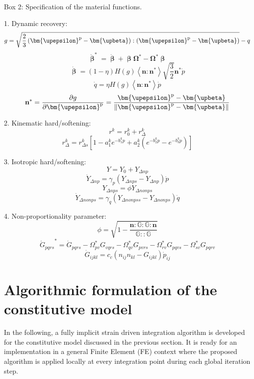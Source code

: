\begin{framed}
\label{Box:1}
Box 2: Specification of the material functions.

1. Dynamic recovery:
\[g = \sqrt {\frac{2}{3}\left( {{{\bm{\upepsilon }}^{\rm{p}}} - {\bm{\upbeta}}} \right):\left( {{{\bm{\upepsilon }}^{\rm{p}}} - {\bm{\upbeta}}} \right)}  - q\]
\[{\mathring {\bm{\upbeta }}^{*}} = \dot {\bm{\upbeta }}  + \bm{\upbeta } {{\mathbf{\Omega }}^*} - {{\mathbf{\Omega }}^*}\bm{\upbeta }\]
\[\dot{\bm{\upbeta}}  = \left( {1 - \eta } \right)H\left( g \right)\left\langle {{\mathbf{n}}:{{\mathbf{n}}^*}} \right\rangle \sqrt {\frac{3}{2}} {{\mathbf{n}}^*}\dot p\]
\[\dot q = \eta H\left( g \right)\left\langle {{\mathbf{n}}:{{\mathbf{n}}^*}} \right\rangle \dot p\]
\[{{\mathbf{n}}^*} = \frac{{\partial g}}{{\partial {{\bm{\upepsilon }}^{\rm{p}}}}} = \frac{{{{\bm{\upepsilon }}^{\rm{p}}} - {\bm{\upbeta}}}}{{\left\| {{{\bm{\upepsilon }}^{\rm{p}}} - {\bm{\upbeta}}} \right\|}}\]

2. Kinematic hard/softening:
\[{r^k} = r_0^k + r_\Delta ^k\]
\[r_\Delta ^k = r_{\Delta s}^k\left[ {1 - a_1^k{e^{ - b_1^kp}} + a_2^k({e^{ - b_2^kp}} - {e^{ - b_3^kp}})} \right]\]

3. Isotropic hard/softening:
\[Y = {Y_0} + {Y_{\Delta np}}\]
\[{\dot Y_{\Delta np}} = {\gamma _p}\left( {{Y_{\Delta nps}} - {Y_{\Delta np}}} \right)\dot p\]
\[{Y_{\Delta nps}} = \phi {Y_{\Delta nonps}}\]
\[{\dot Y_{\Delta nonps}} = {\gamma _q}\left( {{Y_{\Delta nonpss}} - {Y_{\Delta nonps}}} \right)\dot q\]


4. Non-proportionality parameter:
\[\phi  = \sqrt {1 - \frac{{{\mathbf{n}}:\mathbb{G}:\mathbb{G}:{\mathbf{n}}}}{{\mathbb{G}::\mathbb{G}}}} \]
\[{\mathring G _{pqrs}}^* = {{\dot G}_{pqrs}} - \Omega _{pv}^*{G_{vqrs}} - \Omega _{qv}^*{G_{pvrs}} - \Omega _{rv}^*{G_{pqvs}} - \Omega _{sv}^*{G_{pqrv}}\]
\[{{\dot G}_{ijkl}} = {c_c}\left( {{n_{ij}}{n_{kl}} - {G_{ijkl}}} \right){{\dot p}_{ij}}\]
\end{framed}

\section{Algorithmic formulation of the constitutive model}
\noindent
In the following, a fully implicit strain driven integration algorithm is developed for the constitutive model discussed in the previous section. It is ready for an implementation in a general Finite Element (FE) context where the proposed algorithm is applied locally at every integration point during each global iteration step.

